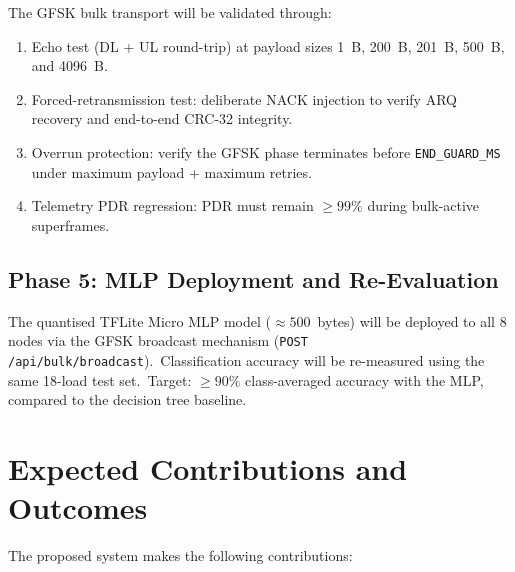 \documentclass[conference]{IEEEtran}
\begin{document}
The GFSK bulk transport will be validated through:
\begin{enumerate}
  \item Echo test (DL + UL round-trip) at payload sizes 1~B, 200~B,
        201~B, 500~B, and 4096~B.
  \item Forced-retransmission test: deliberate NACK injection to verify
        ARQ recovery and end-to-end CRC-32 integrity.
  \item Overrun protection: verify the GFSK phase terminates before
        \texttt{END\_GUARD\_MS} under maximum payload + maximum retries.
  \item Telemetry PDR regression: PDR must remain \(\ge 99\%\) during
        bulk-active superframes.
\end{enumerate}

\subsection{Phase 5: MLP Deployment and Re-Evaluation}

The quantised TFLite Micro MLP model (\(\approx 500\)~bytes) will be
deployed to all 8 nodes via the GFSK broadcast mechanism
(\texttt{POST /api/bulk/broadcast}).\ Classification accuracy will be
re-measured using the same 18-load test set.\ Target: \(\ge 90\%\)
class-averaged accuracy with the MLP, compared to the decision tree
baseline.

\section{Expected Contributions and Outcomes}
\label{sec:contributions}

The proposed system makes the following contributions:
\end{document}
